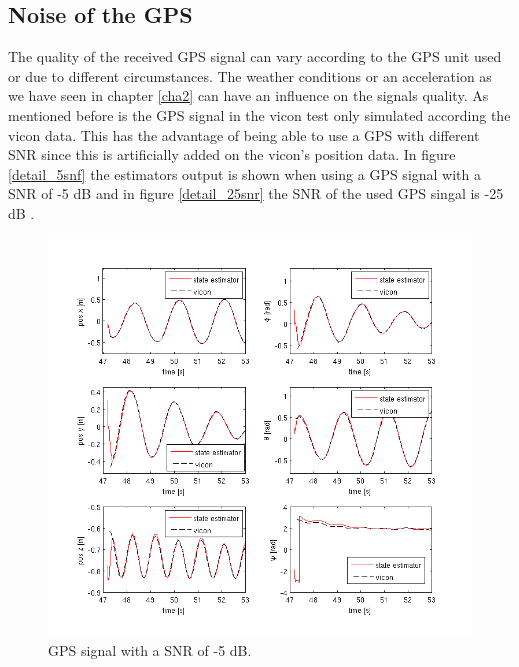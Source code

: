 \subsection{Noise of the GPS}\label{noise}
The quality of the received GPS signal can vary according to the GPS unit used or due to different circumstances. The weather conditions or  an acceleration as we have seen in chapter \ref{cha2} can have an influence on the signals quality. As mentioned before is the GPS signal in the vicon test only simulated according the vicon data. This has the advantage of being able to use a GPS with different SNR since this is artificially added on the vicon's position data.
In figure \ref{detail_5snf} the estimators output is shown when using a GPS signal with a SNR of -5 dB and in figure \ref{detail_25snr} the SNR of the used GPS singal is -25 dB .
\begin{figure}[h]
\centering
\includegraphics[width=1\textwidth]{pictures/2_2_SNR5_detail_GPS.png}
\caption{GPS signal with a SNR of -5 dB.}
\label{detail_5snr}
\end{figure}
